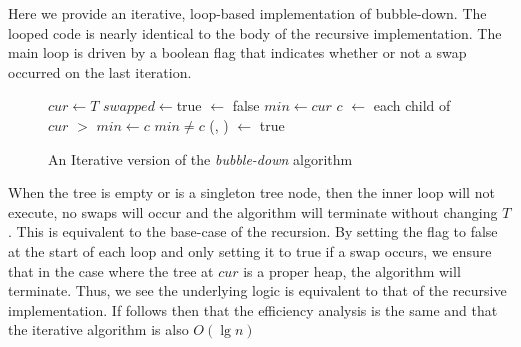 \documentclass[]{article}
\begin{document}
Here we provide an iterative, loop-based implementation of bubble-down.  The looped code is nearly identical to the body of the recursive implementation. The main loop is driven by a boolean flag that indicates whether or not a swap occurred on the last iteration.   

\begin{figure}[ht]
\begin{center}
\begin{varwidth}{\linewidth}
\begin{codebox}
\li $cur \gets T$
\li $swapped \gets $true
\li \While {} \Do
\li    {} $\gets$ false 
\li    $min \gets cur$
\li    \For $c$ $\gets$ each child of $cur$ \Do 
\li       \If {} $>$ 
\li          \Then
               $min \gets c$
            \End
       \End     
\li  \If $min \neq c$ \Then 
\li     {}(, )
\li     {} $\gets$ true
	 \End
   \End	 
\end{codebox}
\end{varwidth}
\end{center}
\caption{An Iterative version of the \textit{bubble-down} algorithm}
\end{figure}

When the tree  is empty or is a singleton tree node, then the inner loop will not execute, no swaps will occur and the algorithm will terminate without changing $T$. This is equivalent to the base-case of the recursion. By setting the flag  to false at the start of each loop and only setting it to true if a swap occurs, we ensure that in the case where the tree at $cur$ is a proper heap, the algorithm will terminate. Thus, we see the underlying logic is equivalent to that of the recursive implementation.  If follows then that the efficiency analysis is the same and that the iterative algorithm is also $O(\lg n)$
\end{document}
